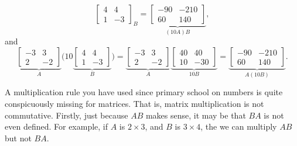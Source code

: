 \documentclass{ximera}
\begin{document}
\begin{example}
\begin{equation*}
{\begin{bmatrix}
            4 & 4 \\ 
            1 & -3
        \end{bmatrix}
        }_B = \underbrace{
        \begin{bmatrix}
            -90 & -210 \\ 
            60 & 140
        \end{bmatrix}
        }_{(10 A)B} ,
    \end{equation*}
    and
    \begin{equation*}
        \underbrace{
        \begin{bmatrix}
            -3 & 3 \\ 
            2 & -2
        \end{bmatrix}
        }_A \biggl( 10 \underbrace{
        \begin{bmatrix}
            4 & 4 \\ 
            1 & -3
        \end{bmatrix}
        }_B \biggr) =\underbrace{
        \begin{bmatrix}
            -3 & 3 \\ 
            2 & -2
        \end{bmatrix}
        }_{A} \underbrace{
        \begin{bmatrix}
            40 & 40 \\ 
            10 & -30
        \end{bmatrix}
        }_{10B} = \underbrace{
        \begin{bmatrix}
            -90 & -210 \\ 
            60 & 140
        \end{bmatrix}
        }_{A(10B)} .
    \end{equation*}
\end{example}

A multiplication rule you have used since primary school on numbers is quite conspicuously missing for matrices. That is, matrix multiplication is not commutative.  Firstly, just because $AB$ makes sense, it may be that $BA$ is not even defined.  For example, if $A$ is $2 \times 3$, and $B$ is $3 \times 4$, the we can multiply $AB$ but not $BA$.
\end{document}
